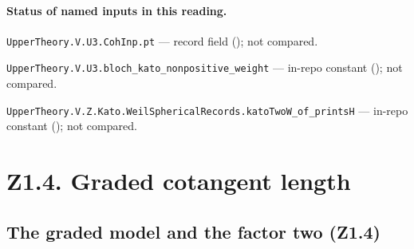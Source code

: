 
\paragraph{Status of named inputs in this reading.}
\noindent\nolinkurl{UpperTheory.V.U3.CohInp.pt} --- record field (); not compared.\par
\noindent\nolinkurl{UpperTheory.V.U3.bloch_kato_nonpositive_weight} --- in-repo constant (); not compared.\par
\noindent\nolinkurl{UpperTheory.V.Z.Kato.WeilSphericalRecords.katoTwoW_of_printsH} --- in-repo constant (); not compared.\par

\section*{Z1.4. Graded cotangent length}

\subsection{The graded model and the factor two (Z1.4)}
\label{sec:P-z14-full}


